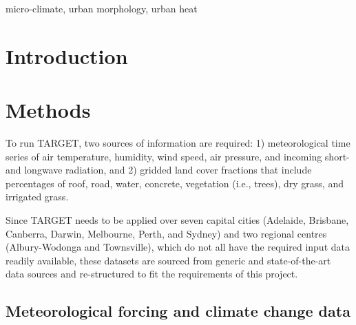 \documentclass[final,3p,times,authoryear]{elsarticle}
\begin{document}
\begin{keyword}
micro-climate\sep 
urban morphology\sep
urban heat
\end{keyword}



\maketitle





\section{Introduction}



\section{Methods}\label{sec:methods}


To run TARGET, two sources of information are required: 1) meteorological time series of air temperature, humidity, wind speed, air pressure, and incoming short- and longwave radiation, and 2) gridded land cover fractions that include percentages of roof, road, water, concrete, vegetation (i.e., trees), dry grass, and irrigated grass. 

Since TARGET needs to be applied over seven capital cities (Adelaide, Brisbane, Canberra, Darwin, Melbourne, Perth, and Sydney) and two regional centres (Albury-Wodonga and Townsville), which do not all have the required input data readily available, these datasets are sourced from generic and state-of-the-art data sources and re-structured to fit the requirements of this project. 

\subsection{Meteorological forcing and climate change data}\label{sec:forcing}




\end{document}
